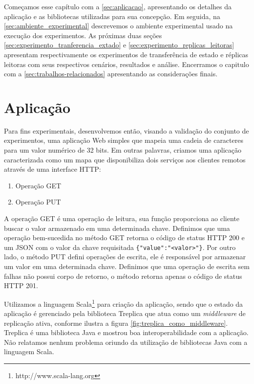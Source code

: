 Começamos esse capítulo com a \autoref{sec:aplicacao}, apresentando os detalhes da
aplicação e as bibliotecas utilizadas para sua concepção. Em seguida, na
\autoref{sec:ambiente_experimental} descrevemos o ambiente experimental usado na execução
dos experimentos. As próximas duas seções \autoref{sec:experimento_tranferencia_extado} e
\autoref{sec:experimento_replicas_leitoras} apresentam respectivamente os experimentos de
transferência de estado e réplicas leitoras com seus respectivos cenários, resultados e
análise. Encerramos o capitulo com a \autoref{sec:trabalhos-relacionados} apresentando as
considerações finais.


\section{Aplicação}\label{aplicacao}

Para fins experimentais, desenvolvemos então, visando a validação do conjunto de
experimentos, uma aplicação Web simples que mapeia uma cadeia de caracteres para um valor
numérico de 32 bits. Em outras palavras, criamos uma aplicação caracterizada como um mapa
que disponibiliza dois serviços aos clientes remotos através de uma interface HTTP:

\begin{enumerate}
  \item Operação GET 
  \item Operação PUT 
\end{enumerate}

A operação GET é uma operação de leitura, sua função proporciona ao cliente buscar o valor
armazenado em uma determinada chave. Definimos que uma operação bem-sucedida no método GET
retorna o código de status HTTP 200 e um JSON com o valor da chave requisitada
\verb|{"value":"<valor>"}|. Por outro lado, o método PUT defini operações de escrita, ele
é responsável por armazenar um valor em uma determinada chave. Definimos que uma operação
de escrita sem falhas não possui corpo de retorno, o método retorna apenas o código de
status HTTP 201.

Utilizamos a linguagem Scala\footnote{http://www.scala-lang.org} para criação da
aplicação, sendo que o estado da aplicação é gerenciado pela biblioteca Treplica que atua
como um \emph{middleware} de replicação ativa, conforme ilustra a figura
\autoref{fig:treplica_como_middleware}. Treplica é uma biblioteca Java e mostrou boa
interoperabilidade com a aplicação. Não relatamos nenhum problema oriundo da utilização de
bibliotecas Java com a linguagem Scala.

